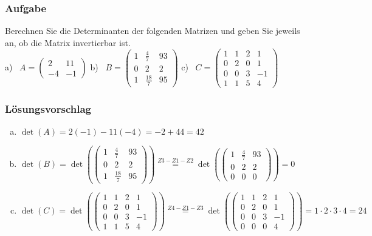 \documentclass[a4paper,11pt]{scrartcl}
\newcounter{auf}
\newcommand{\Aufgabe}%
        {\addtocounter{auf}{1} \subsubsection*{\rmfamily  Aufgabe \theauf \hspace{1em}} }
\begin{document}
\newpage
\Aufgabe
Berechnen Sie die Determinanten der folgenden Matrizen und geben Sie jeweils an, ob die Matrix invertierbar ist.\\
%
\hspace*{10mm} a) \ $A=\begin{pmatrix} 2 & 11 \\ -4 & -1 \end{pmatrix}$ \qquad
b) \ $B=\begin{pmatrix} 1 & \frac{4}{7} & 93 \\ 0 & 2 & 2 \\1 & \frac{18}{7} & 95 \end{pmatrix}$ \qquad
c) \ $C=\begin{pmatrix} 1 & 1 &  2 & 1 \\ 0 & 2 & 0 & 1 \\ 0 & 0& 3 & -1 \\ 1 & 1 & 5 & 4 \end{pmatrix}$
%
%
\subsubsection*{Lösungsvorschlag}
\begin{enumerate}[a)]
\item $\det(A)=2(-1)-11(-4)=-2+44=42$
\item $\det(B)=\det(\begin{pmatrix} 1 & \frac{4}{7} & 93 \\ 0 & 2 & 2 \\1 & \frac{18}{7} & 95 \end{pmatrix})\stackrel{Z3-Z1-Z2}{=}\det(\begin{pmatrix} 1 & \frac{4}{7} & 93 \\ 0 & 2 & 2 \\0&0&0 \end{pmatrix})=0$
\item $\det(C)=\det(\begin{pmatrix} 1 & 1 &  2 & 1 \\ 0 & 2 & 0 & 1 \\ 0 & 0& 3 & -1 \\ 1 & 1 & 5 & 4 \end{pmatrix})\stackrel{Z4-Z1-Z3}{=}\det(\begin{pmatrix} 1 & 1 &  2 & 1 \\ 0 & 2 & 0 & 1 \\ 0 & 0& 3 & -1 \\ 0 & 0 & 0 & 4 \end{pmatrix})=1\cdot2\cdot3\cdot4=24$
\end{enumerate}
\end{document}
